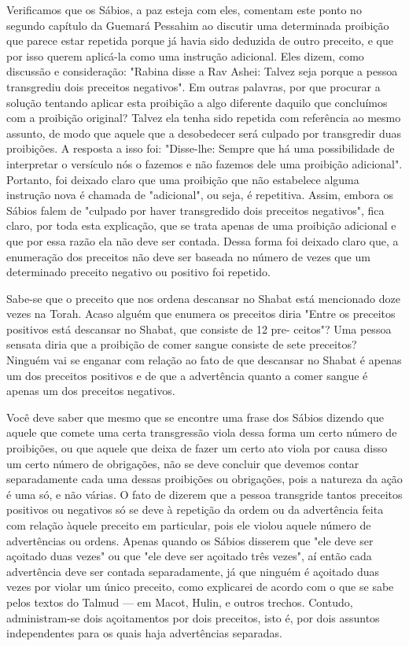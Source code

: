 \begin{itemize}
\begin{enumrate}
Verificamos que os Sábios, a paz esteja com eles, comentam este pon­to
no segundo capítulo da Guemará Pessahim ao discutir uma determinada
proi­bição que parece estar repetida porque já havia sido deduzida de
outro precei­to, e que por isso querem aplicá-la como uma instrução
adicional. Eles dizem, como discussão e consideração: "Rabina disse a
Rav Ashei: Talvez seja porque a pessoa transgrediu dois preceitos
negativos". Em outras palavras, por que pro­curar a solução tentando
aplicar esta proibição a algo diferente daquilo que con­cluímos com a
proibição original? Talvez ela tenha sido repetida com referên­cia ao
mesmo assunto, de modo que aquele que a desobedecer será culpado por
transgredir duas proibições. A resposta a isso foi: "Disse-lhe: Sempre
que há uma possibilidade de interpretar o versículo nós o fazemos e não
fazemos dele uma proibição adicional". Portanto, foi deixado claro que
uma proibição que não estabelece alguma instrução nova é chamada de
"adicional", ou seja, é repetitiva. Assim, embora os Sábios falem de
"culpado por haver transgredi­do dois preceitos negativos", fica claro,
por toda esta explicação, que se trata apenas de uma proibição adicional
e que por essa razão ela não deve ser conta­da. Dessa forma foi deixado
claro que, a enumeração dos preceitos não deve ser baseada no número de
vezes que um determinado preceito negativo ou po­sitivo foi repetido.

Sabe-se que o preceito que nos ordena descansar no Shabat está
men­cionado doze vezes na Torah. Acaso alguém que enumera os preceitos
diria "Entre os preceitos positivos está descansar no Shabat, que
consiste de 12 pre-
ceitos"? Uma pessoa sensata diria que a proibição de comer sangue
consiste de sete preceitos? Ninguém vai se enganar com relação ao fato
de que descan­sar no Shabat é apenas um dos preceitos positivos e de que
a advertência quan­to a comer sangue é apenas um dos preceitos
negativos.

Você deve saber que mesmo que se encontre uma frase dos Sábios dizendo
que aquele que comete uma certa transgressão viola dessa forma um certo
número de proibições, ou que aquele que deixa de fazer um certo ato
viola por causa disso um certo número de obrigações, não se deve
concluir que devemos contar separadamente cada uma dessas proibições ou
obrigações, pois a natureza da ação é uma só, e não várias. O fato de
dizerem que a pessoa transgride tantos preceitos positivos ou negativos
só se deve à repetição da or­dem ou da advertência feita com relação
àquele preceito em particular, pois ele violou aquele número de
advertências ou ordens. Apenas quando os Sábios disserem que "ele deve
ser açoitado duas vezes" ou que "ele deve ser açoitado três vezes", aí
então cada advertência deve ser contada separadamente, já que ninguém é
açoitado duas vezes por violar um único preceito, como explicarei de
acordo com o que se sabe pelos textos do Talmud --- em Macot, Hulin, e
outros trechos. Contudo, administram-se dois açoitamentos por dois
preceitos, isto é, por dois assuntos independentes para os quais haja
advertências separadas.


\end{enumrate}
\end{itemize}
